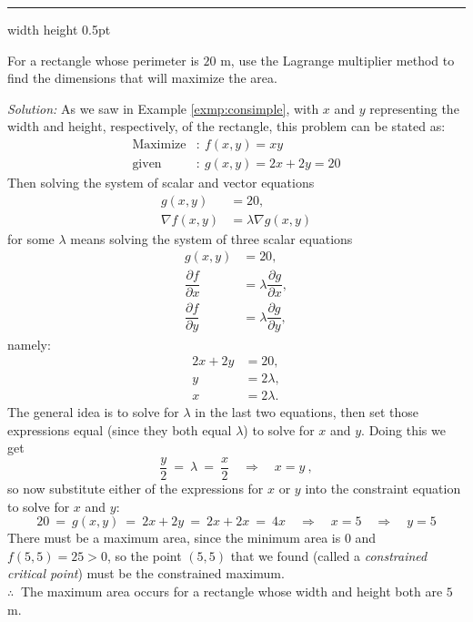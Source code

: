 \medskip
\hrule width \textwidth height 0.5pt
\begin{exmp}\label{exmp:rectlm}
 For a rectangle whose perimeter is $20$ m, use the Lagrange multiplier method to find the dimensions that will
 maximize the area.\smallskip
 \par\noindent \emph{Solution:} As we saw in Example \ref{exmp:consimple}, with $x$ and $y$ representing the width and
  height, respectively, of the rectangle, this problem can be stated as:
 \begin{align*}
  \text{Maximize}&: ~ f(x,y) = xy\\
  \text{given}&: ~ g(x,y) = 2x + 2y = 20
 \end{align*}
Then solving the system of scalar and vector equations 
\begin{align*}
g(x,y) & = 20,
\\
\nabla f(x,y) &= \lambda \nabla g(x,y)
\end{align*}
for some $\lambda$ means solving the system of three scalar equations
\begin{align*}
g(x,y) & = 20,
\\
 \dfrac{\partial f}{\partial x} &= \lambda \dfrac{\partial g}{\partial x},
 \\
 \dfrac{\partial f}{\partial y} &= \lambda \dfrac{\partial g}{\partial y},
\end{align*}
 namely:
\begin{align*}
2x + 2y &= 20,
\\
y &= 2\lambda,
\\
x &= 2\lambda.
 \end{align*}
 The general idea is to solve for $\lambda$ in the last two equations, then set those expressions equal (since they both equal
 $\lambda$) to solve for $x$ and $y$. Doing this we get
 \begin{displaymath}
  \frac{y}{2} ~=~ \lambda ~=~ \frac{x}{2} \quad \Rightarrow \quad x = y ~,
 \end{displaymath}
 so now substitute either of the expressions for $x$ or $y$ into the constraint equation to solve for $x$ and $y$:
 \begin{displaymath}
  20 ~=~ g(x,y) ~=~ 2x + 2y ~= ~2x + 2x ~=~ 4x \quad \Rightarrow \quad x = 5 \quad \Rightarrow \quad y = 5
 \end{displaymath}
 There must be a maximum area, since the minimum area is $0$ and $f(5,5) = 25 > 0$, so the point $(5,5)$ that we found
 (called a \emph{constrained critical point}) must be the constrained maximum.\\
 $\therefore ~$ 
 The maximum area occurs for a rectangle whose width and height both are $5$ m.
\end{exmp}
